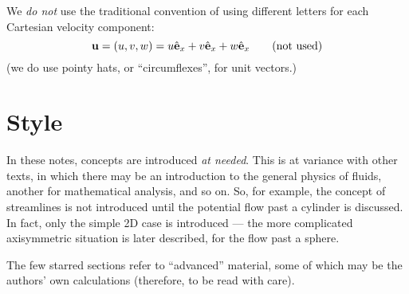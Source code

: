 We \emph{do not} use the traditional convention of using different
letters for each Cartesian velocity component:
\[
  \mathbf{u} = ( u , v, w ) =
  u \hat{\mathbf{e}}_x +
  v \hat{\mathbf{e}}_x +
  w \hat{\mathbf{e}}_x   \qquad \text{(not used)} 
\]
(we do use pointy hats, or ``circumflexes'', for unit vectors.)

\section{Style}

In these notes, concepts are introduced \emph{at needed}. This is at
variance with other texts, in which there may be an introduction to
the general physics of fluids, another for mathematical analysis, and
so on. So, for example, the concept of streamlines is not introduced
until the potential flow past a cylinder is discussed. In fact, only
the simple 2D case is introduced --- the more complicated axisymmetric
situation is later described, for the flow past a sphere.

The few starred sections refer to ``advanced'' material, some of which
may be the authors' own calculations (therefore, to be read with
care).
